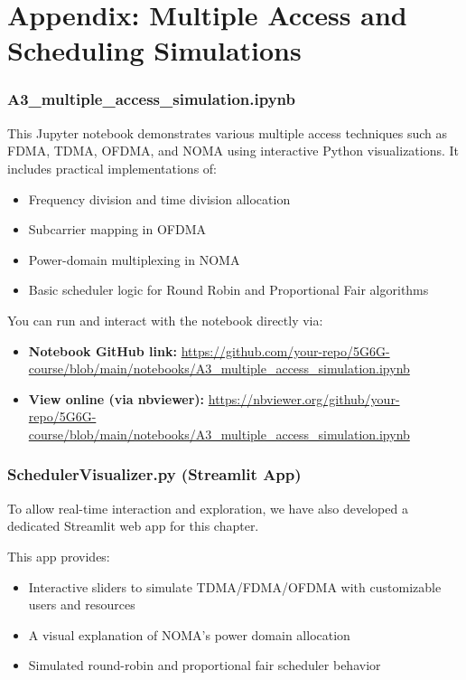 
\chapter{Appendix: Multiple Access and Scheduling Simulations}

\subsection{A3\_multiple\_access\_simulation.ipynb}

This Jupyter notebook demonstrates various multiple access techniques such as FDMA, TDMA, OFDMA, and NOMA using interactive Python visualizations. It includes practical implementations of:

\begin{itemize}
  \item Frequency division and time division allocation
  \item Subcarrier mapping in OFDMA
  \item Power-domain multiplexing in NOMA
  \item Basic scheduler logic for Round Robin and Proportional Fair algorithms
\end{itemize}

\noindent You can run and interact with the notebook directly via:

\begin{itemize}
  \item \textbf{Notebook GitHub link:} \url{https://github.com/your-repo/5G6G-course/blob/main/notebooks/A3_multiple_access_simulation.ipynb}
  \item \textbf{View online (via nbviewer):} \url{https://nbviewer.org/github/your-repo/5G6G-course/blob/main/notebooks/A3_multiple_access_simulation.ipynb}
\end{itemize}

\vspace{1em}
\subsection{SchedulerVisualizer.py (Streamlit App)}

To allow real-time interaction and exploration, we have also developed a dedicated Streamlit web app for this chapter.

This app provides:
\begin{itemize}
  \item Interactive sliders to simulate TDMA/FDMA/OFDMA with customizable users and resources
  \item A visual explanation of NOMA’s power domain allocation
  \item Simulated round-robin and proportional fair scheduler behavior
\end{itemize}

